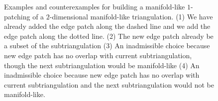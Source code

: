 \documentclass[a4paper]{article}
\begin{document}
\begin{figure}
    \caption{Examples and counterexamples for building a manifold-like $1$-patching of a $2$-dimensional manifold-like triangulation. (1) We have already added the edge patch along the dashed line and we add the edge patch along the dotted line. (2) The new edge patch already be a subset of the subtriangulation (3) An inadmissible choice because new edge patch has no overlap with current subtriangulation, though the next subtriangulation would be manifold-like (4) An inadmissible choice because new edge patch has no overlap with current subtriangulation and the next subtriangulation would not be manifold-like.}\label{figure:illustrationpatching}
\end{figure}
\end{document}
